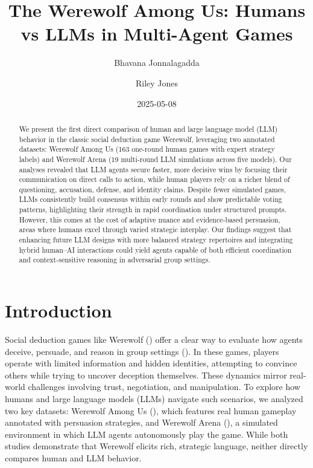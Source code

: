 \documentclass[
  letterpaper,
  DIV=11,
  numbers=noendperiod,
  oneside]{scrreprt}
\title{The Werewolf Among Us: Humans vs LLMs in Multi-Agent Games}
\author{Bhavana Jonnalagadda \and Riley Jones}
\date{2025-05-08}
\renewcommand*\contentsname{Table of contents}
\newcommand\contentsname{Table of contents}
\begin{document}
\maketitle
\begin{abstract}
We present the first direct comparison of human and large language model
(LLM) behavior in the classic social deduction game Werewolf, leveraging
two annotated datasets: Werewolf Among Us (163 one‐round human games
with expert strategy labels) and Werewolf Arena (19 multi‐round LLM
simulations across five models). Our analyses revealed that LLM agents
secure faster, more decisive wins by focusing their communication on
direct calls to action, while human players rely on a richer blend of
questioning, accusation, defense, and identity claims. Despite fewer
simulated games, LLMs consistently build consensus within early rounds
and show predictable voting patterns, highlighting their strength in
rapid coordination under structured prompts. However, this comes at the
cost of adaptive nuance and evidence‐based persuasion, areas where
humans excel through varied strategic interplay. Our findings suggest
that enhancing future LLM designs with more balanced strategy
repertoires and integrating hybrid human--AI interactions could yield
agents capable of both efficient coordination and context‐sensitive
reasoning in adversarial group settings.
\end{abstract}

\renewcommand*\contentsname{Table of contents}
{
\hypersetup{linkcolor=}
\setcounter{tocdepth}{2}
\tableofcontents
}

\chapter{Introduction}\label{introduction}

Social deduction games like Werewolf
() offer a clear
way to evaluate how agents deceive, persuade, and reason in group
settings (). In these games, players operate with limited information and
hidden identities, attempting to convince others while trying to uncover
deception themselves. These dynamics mirror real-world challenges
involving trust, negotiation, and manipulation. To explore how humans
and large language models (LLMs) navigate such scenarios, we analyzed
two key datasets: Werewolf Among Us
(), which
features real human gameplay annotated with persuasion strategies, and
Werewolf Arena (), a simulated environment in which LLM agents
autonomously play the game. While both studies demonstrate that Werewolf
elicits rich, strategic language, neither directly compares human and
LLM behavior.
\end{document}

